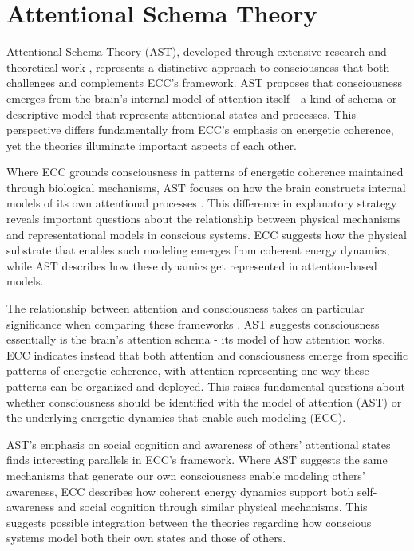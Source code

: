 \section{Attentional Schema Theory}

Attentional Schema Theory (AST), developed through extensive research and theoretical work \cite{Graziano2013, Graziano2019}, represents a distinctive approach to consciousness that both challenges and complements ECC's framework. AST proposes that consciousness emerges from the brain's internal model of attention itself - a kind of schema or descriptive model that represents attentional states and processes. This perspective differs fundamentally from ECC's emphasis on energetic coherence, yet the theories illuminate important aspects of each other.

Where ECC grounds consciousness in patterns of energetic coherence maintained through biological mechanisms, AST focuses on how the brain constructs internal models of its own attentional processes \cite{Graziano2011}. This difference in explanatory strategy reveals important questions about the relationship between physical mechanisms and representational models in conscious systems. ECC suggests how the physical substrate that enables such modeling emerges from coherent energy dynamics, while AST describes how these dynamics get represented in attention-based models.

The relationship between attention and consciousness takes on particular significance when comparing these frameworks \cite{GrazianoWebb2015}. AST suggests consciousness essentially is the brain's attention schema - its model of how attention works. ECC indicates instead that both attention and consciousness emerge from specific patterns of energetic coherence, with attention representing one way these patterns can be organized and deployed. This raises fundamental questions about whether consciousness should be identified with the model of attention (AST) or the underlying energetic dynamics that enable such modeling (ECC).

AST's emphasis on social cognition and awareness of others' attentional states \cite{Kelly2014} finds interesting parallels in ECC's framework. Where AST suggests the same mechanisms that generate our own consciousness enable modeling others' awareness, ECC describes how coherent energy dynamics support both self-awareness and social cognition through similar physical mechanisms. This suggests possible integration between the theories regarding how conscious systems model both their own states and those of others.

